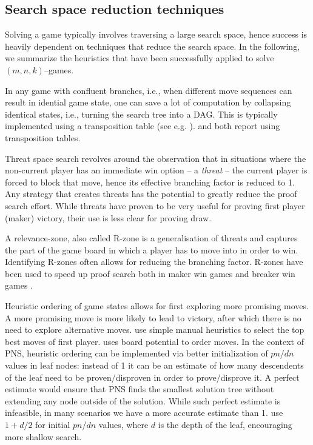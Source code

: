 \documentclass[conference]{IEEEtran}
\theoremstyle{definition}
\newcommand{\pn}{$pn$\xspace}
\newcommand{\dn}{$dn$\xspace}
\begin{document}
\subsection{Search space reduction techniques}
Solving a game typically involves traversing a large search space, hence success is heavily dependent on techniques that reduce the search space. In the following, we summarize the heuristics that have been successfully applied to solve $(m,n,k)$--games.

In any game with confluent branches, i.e., when different move sequences can result in idential game state, one can save a lot of computation by collapsing identical states, i.e., turning the search tree into a DAG. This is typically implemented using a transposition table (see e.g. \cite{pns_transposition}). \cite{Allis1994SearchingFS} and \cite{HSU202079} both report using transposition tables.

Threat space search \cite{Allis1994SearchingFS} revolves around the observation that in situations where the non-current player has an immediate win option -- a \emph{threat} -- the current player is forced to block that move, hence its effective branching factor is reduced to 1. Any strategy that creates threats has the potential to greatly reduce the proof search effort. While threats have proven to be very useful for proving first player (maker) victory, their use is less clear for proving draw.

A relevance-zone, also called R-zone is a generalisation of threats and captures the part of the game board in which a player has to move into in order to win. Identifying R-zones often allows for reducing the branching factor. R-zones have been used to speed up proof search both in maker win games \cite{connect_mnkpq,relevance_zone} and breaker win games \cite{HSU202079}.

Heuristic ordering of game states allows for first exploring more promising moves. A more promising move is more likely to lead to victory, after which there is no need to explore alternative moves. \cite{Allis1994SearchingFS} use simple manual heuristics to select the top best moves of first player. \cite{HSU202079} uses board potential to order moves. In the context of PNS, heuristic ordering can be implemented via better initialization of \pn/\dn values in leaf nodes: instead of 1 it can be an estimate of how many descendents of the leaf need to be proven/disproven in order to prove/disprove it. A perfect estimate would ensure that PNS finds the smallest solution tree without extending any node outside of the solution. While such perfect estimate is infeasible, in many scenarios we have a more accurate estimate than 1. \cite{Allis1994SearchingFS} use $1+d/2$ for initial \pn/\dn values, where $d$ is the depth of the leaf, encouraging more shallow search. %
\end{document}
